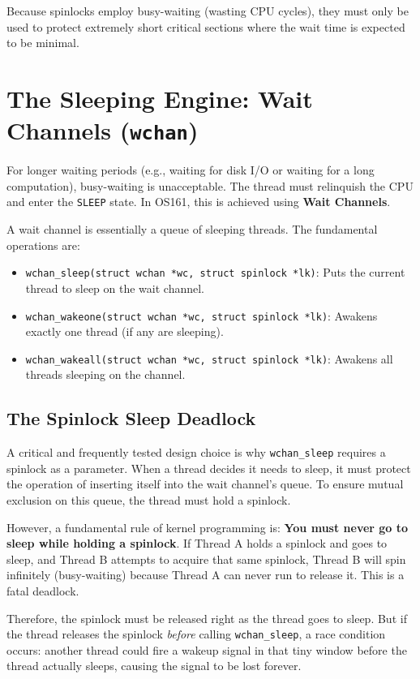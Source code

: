 Because spinlocks employ busy-waiting (wasting CPU cycles), they must only be used to protect extremely short critical sections where the wait time is expected to be minimal. 


\section{The Sleeping Engine: Wait Channels (\texttt{wchan})}
For longer waiting periods (e.g., waiting for disk I/O or waiting for a long computation), busy-waiting is unacceptable. The thread must relinquish the CPU and enter the \texttt{SLEEP} state. In OS161, this is achieved using \textbf{Wait Channels}.

A wait channel is essentially a queue of sleeping threads. The fundamental operations are:
\begin{itemize}
    \item \texttt{wchan\_sleep(struct wchan *wc, struct spinlock *lk)}: Puts the current thread to sleep on the wait channel.
    \item \texttt{wchan\_wakeone(struct wchan *wc, struct spinlock *lk)}: Awakens exactly one thread (if any are sleeping).
    \item \texttt{wchan\_wakeall(struct wchan *wc, struct spinlock *lk)}: Awakens all threads sleeping on the channel.
\end{itemize}

\subsection{The Spinlock Sleep Deadlock}
A critical and frequently tested design choice is why \texttt{wchan\_sleep} requires a spinlock as a parameter.
When a thread decides it needs to sleep, it must protect the operation of inserting itself into the wait channel's queue. To ensure mutual exclusion on this queue, the thread must hold a spinlock. 

However, a fundamental rule of kernel programming is: \textbf{You must never go to sleep while holding a spinlock}. If Thread A holds a spinlock and goes to sleep, and Thread B attempts to acquire that same spinlock, Thread B will spin infinitely (busy-waiting) because Thread A can never run to release it. This is a fatal deadlock.

Therefore, the spinlock must be released right as the thread goes to sleep. But if the thread releases the spinlock \textit{before} calling \texttt{wchan\_sleep}, a race condition occurs: another thread could fire a wakeup signal in that tiny window before the thread actually sleeps, causing the signal to be lost forever.

